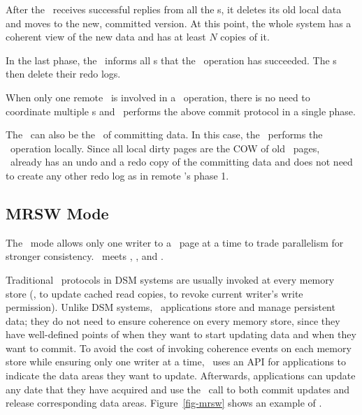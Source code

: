 After the \xn\ receives successful replies from all the \on{}s, 
it deletes its old local data and moves to the new, committed version. 
At this point, the whole system has a coherent view of the new data
and has at least $N$ copies of it.

In the last phase, the \xn\ informs all \on{}s that the \commitxact\ operation has succeeded.
The \on{}s then delete their redo logs.

When only one remote \on\ is involved in a \commitxact\ operation,
there is no need to coordinate multiple \on{}s
and \hotpot\ performs the above commit protocol in a single phase.

The \xn\ can also be the \on\ of committing data.
In this case, the \xn\ performs the \commitxact\ operation locally.
Since all local dirty pages are the COW of old \committed\ pages,
\xn\ already has an undo and a redo copy of the committing data
and does not need to create any other redo log as in remote \on's phase 1.

\subsection{MRSW Mode}
\label{sec:mrsw}

The \mrsw\ mode allows only one writer to a \nvm\ page at a time
to trade parallelism for stronger consistency. 
\mrsw\ meets \ra, \rcm, and \re.

Traditional \mrsw\ protocols in DSM systems are usually invoked at every memory store
(\eg, to update cached read copies, to revoke current writer's write permission).
Unlike DSM systems, \dsnvm\ applications store and manage persistent data;
they do not need to ensure coherence on every memory store,
since they have well-defined points of when they want to start updating data and when they want to commit.
To avoid the cost of invoking coherence events on each memory store
while ensuring only one writer at a time, 
\hotpot\ uses an {\em \acquire} API for applications to indicate the data areas they want to update.
Afterwards, applications can update any date that they have acquired and use the \commitxact\ call to both 
commit updates and release corresponding data areas.
Figure~\ref{fig-mrsw} shows an example of \mrsw. %

